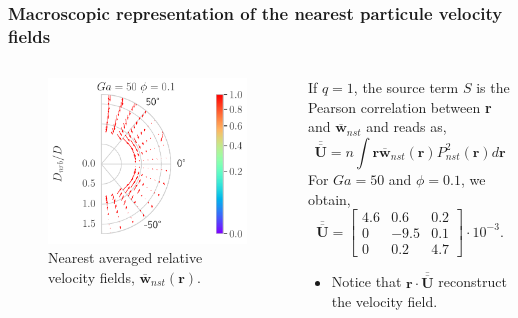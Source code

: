 \documentclass{sintefbeamer}
\newcommand{\nstavg}[1]{\overline{#1}_{nst}}
\begin{document}
\begin{frame}
  \frametitle{ Macroscopic representation of the nearest particule velocity fields}
  \begin{columns}[c]
    \begin{column}{0.5\textwidth}
      \begin{figure}
    
        \includegraphics[height=0.6\textwidth]{image/Dim_3/fDrop/Dmin_Theta_U_rel_Ga_50_PHI_0_1.pdf}
        
        \caption{Nearest averaged relative velocity fields, $\nstavg{\textbf{w}}(\textbf{r})$. }
      \end{figure}
    \end{column}
    \begin{column}{0.5\textwidth}
      If $q=1$, the source term $S$ is the Pearson correlation between \textbf{r} and $\nstavg{\textbf{w}}$ and reads as,
      \begin{equation*}
        \overline{\overline{\textbf{U}}} = n \int \textbf{r} 
        \nstavg{\textbf{w}}(\textbf{r})
        P^2_{nst}(\textbf{r})
        d\textbf{r}
      \end{equation*}
      For $Ga = 50$ and $\phi = 0.1$, we obtain, 
      \begin{equation*}
        \overline{\overline{\textbf{U}}} = \left[
          \begin{matrix}
            4.6 & 0.6  & 0.2 \\
             0 & -9.5 & 0.1 \\
             0 & 0.2 & 4.7
          \end{matrix}
        \right]\cdot 10^{-3}.
      \end{equation*}
      \begin{itemize}
        \item Notice that $\textbf{r} \cdot \overline{\overline{\textbf{U}}}$ reconstruct the velocity field. 
      \end{itemize}
    \end{column}
  \end{columns}
\end{frame}
\end{document}

